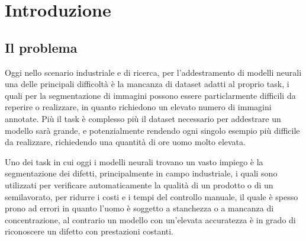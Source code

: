 \chapter{Introduzione}
\begin{comment}
con il problema e l'idea non ci siamp proprio..
la scaletta dei capitoli è:
- introduzione
- stato dell'arte
- metodi e strumenti
- sviluppo del progetto
- risultati

Sottosezioni di introduzione:
- Motivaione

    - modelli neurali per la segmentazione
        - applicazioni
        - il dataset e i requisiti per l'addestramento

- Approccio al problema

    - La generazione di un dataset sintetico

- introduzione alle reti neurali

    - feedforward networks
        - il neurone
        - la funzione di attivazione
        - backpropagation

    - convolutional neural networks
        - la convoluzione
        - il pooling
        - l'upsampling

\end{comment}


\section{Il problema \ok}
\begin{comment}

\end{comment}
Oggi nello scenario industriale e di ricerca, per l'addestramento di modelli neurali una delle 
principali difficoltà è la mancanza di dataset adatti al proprio task, i quali per la segmentazione di immagini possono
essere particlarmente difficili da reperire o realizzare, in quanto richiedono un elevato numero di immagini annotate.
Più il task è complesso più il dataset necessario per addestrare un modello sarà grande,
e potenzialmente rendendo ogni singolo esempio più difficile da realizzare, richiedendo una quantità di ore uomo molto elevata.

Uno dei task in cui oggi i modelli neurali trovano un vasto impiego è la segmentazione dei difetti, principalmente in campo industriale,
i quali sono utilizzati per verificare automaticamente la qualità di un prodotto o di un semilavorato, per ridurre i costi e i tempi del controllo manuale,
il quale è spesso prono ad errori in quanto l'uomo è soggetto a stanchezza o a mancanza di concentrazione,
al contrario un modello con un'elevata accuratezza è in grado di riconoscere un difetto con prestazioni costanti.

